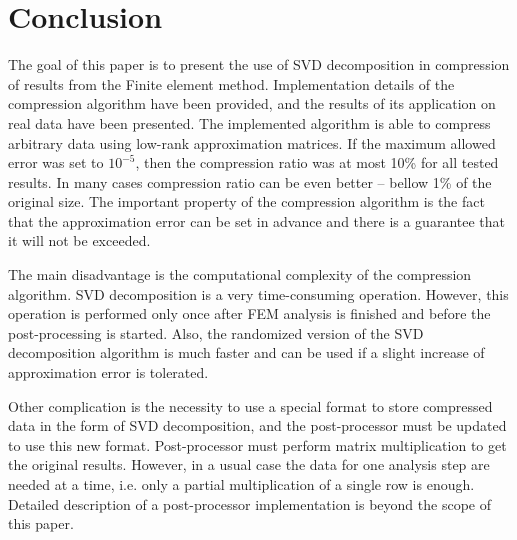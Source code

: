 \section{Conclusion}
\label{sec:conclusion}

The goal of this paper is to present the use of SVD decomposition in compression of results from the Finite element method. Implementation details of the compression algorithm have been provided, and the results of its application on real data have been presented. The implemented algorithm is able to compress arbitrary data using low-rank approximation matrices. If the maximum allowed error was set to $10^{-5}$, then the compression ratio was at most 10\% for all tested results. In many cases compression ratio can be even better -- bellow 1\% of the original size. The important property of the compression algorithm is the fact that the approximation error can be set in advance and there is a guarantee that it will not be exceeded.

The main disadvantage is the computational complexity of the compression algorithm. SVD decomposition is a very time-consuming operation. However, this operation is performed only once after FEM analysis is finished and before the post-processing is started. Also, the randomized version of the SVD decomposition algorithm is much faster and can be used if a slight increase of approximation error is tolerated.

Other complication is the necessity to use a special format to store compressed data in the form of SVD decomposition, and the post-processor must be updated to use this new format. Post-processor must perform matrix multiplication to get the original results. However, in a usual case the data for one analysis step are needed at a time, i.e. only a partial multiplication of a single row is enough. Detailed description of a post-processor implementation is beyond the scope of this paper.
